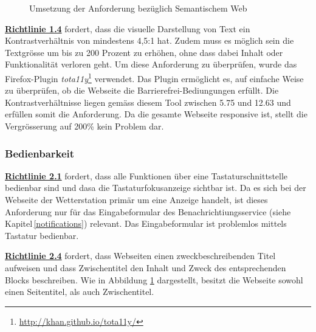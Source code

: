 \begin{figure}[h!]
	\centering
	\caption{Umsetzung der Anforderung bezüglich Semantischem Web}
	\label{img:semWeb}
\end{figure}

\noindent
\href{https://www.w3.org/Translations/WCAG20-de/#visual-audio-contrast}{\textbf{Richtlinie 1.4}} fordert, dass die visuelle Darstellung von Text ein Kontrastverhältnis von mindestens 4,5:1 hat. Zudem muss es möglich sein die Textgrösse um bis zu 200 Prozent zu erhöhen, ohne dass dabei Inhalt oder Funktionalität verloren geht. Um diese Anforderung zu überprüfen, wurde das Firefox-Plugin \textit{tota11y}\footnote{\url{http://khan.github.io/tota11y/}} verwendet. Das Plugin ermöglicht es, auf einfache Weise zu überprüfen, ob die Webseite die Barrierefrei-Bediungungen erfüllt. Die Kontrastverhältnisse liegen gemäss diesem Tool zwischen 5.75 und 12.63 und erfüllen somit die Anforderung. Da die gesamte Webseite responsive ist, stellt die Vergrösserung auf 200\% kein Problem dar.


\subsubsection{Bedienbarkeit}
\href{https://www.w3.org/Translations/WCAG20-de/#keyboard-operation}{\textbf{Richtlinie 2.1}} fordert, dass alle Funktionen über eine Tastaturschnittstelle bedienbar sind und dasa die Tastaturfokusanzeige sichtbar ist.
Da es sich bei der Webseite der Wetterstation primär um eine Anzeige handelt, ist dieses Anforderung nur für das Eingabeformular des Benachrichtiungsservice (siehe Kapitel\,\ref{notifications}) relevant. Das Eingabeformular ist problemlos mittels Tastatur bedienbar.\newline

\noindent
\href{https://www.w3.org/Translations/WCAG20-de/#navigation-mechanisms}{\textbf{Richtlinie 2.4}} fordert, dass Webseiten einen zweckbeschreibenden Titel aufweisen und dass Zwischentitel den Inhalt und Zweck des entsprechenden Blocks beschreiben. Wie in Abbildung \ref{img:semWeb} dargestellt, besitzt die Webseite sowohl einen Seitentitel, als auch Zwischentitel.


